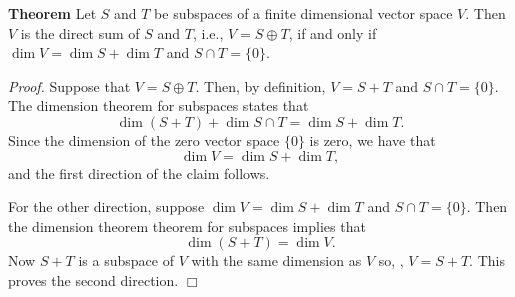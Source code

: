 \documentclass[12pt]{article}
\begin{document}
{\bf Theorem} 
Let $S$ and $T$ be subspaces of a finite dimensional vector space
$V$. Then $V$ is the direct sum of $S$ and $T$, i.e., $V=S\oplus T$,
if and only if $\dim V = \dim S + \dim T$ and $S\cap T = \{0\}$. 

\emph{Proof.} Suppose that $V=S\oplus T$. Then, by definition, 
$V=S+T$ and $S\cap T=\{0\}$.  
The dimension theorem for subspaces states that 
$$\dim (S+T) + \dim S\cap T = \dim S + \dim T.$$
Since the dimension of the zero vector space $\{0\}$
is zero, we have that 
$$\dim V = \dim S + \dim T,$$
and the first direction of the claim follows. 

For the other direction, suppose $\dim V = \dim S + \dim T$ 
and $S\cap T = \{0\}$. Then the 
dimension theorem theorem for subspaces implies that 
$$\dim (S+T) = \dim V.$$
Now $S+T$ is a subspace of $V$ with the same dimension
as $V$ so, 
, 
$V=S+T$. This proves the second direction. $\Box$
\end{document}
